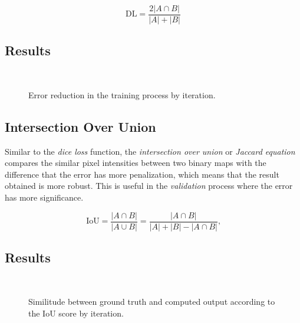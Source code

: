   \begin{equation}\label{eq:dice_loss}
      \text{DL} = \frac{2|A \cap B |}{|A| + |B|}
  \end{equation}        


\subsection{Results}

\begin{figure}[h]
  \centering
   \\
  \caption{Error reduction in the training process by iteration.}
  \label{fig:DL_plots}
\end{figure}


\subsection{Intersection Over Union}
Similar to the \emph{dice loss} function, the \emph{intersection over union} or \emph{Jaccard equation} compares the similar pixel intensities between two binary maps with the difference that the error has more penalization, which means that the result obtained is more robust. This is useful in the \emph{validation} process where the error has more significance.

\begin{equation}\label{eq:jacc}
  \text{IoU} = \frac{|A \cap B|}{| A \cup B |} = \frac{|A \cap B|}{|A| + |B| - |A \cap B|} \text{,}
\end{equation}

\subsection{Results}

\begin{figure}[h]
  \centering
   \\
  \caption{Similitude between ground truth and computed output according to the IoU score by iteration.}
  \label{fig:IoU_plots}
\end{figure}

